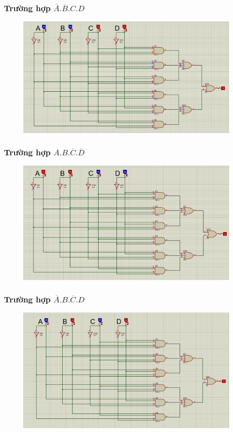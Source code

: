 \subsubsection{Trường hợp $\overline{A}.\overline{B}.C.D$}
\begin{figure}[H]
    \centering
    \includegraphics[width=\textwidth]{pictures/b2.2.png}
\end{figure}
\subsubsection{Trường hợp $A.B.\overline{C}.\overline{D}$}
\begin{figure}[H]
    \centering
    \includegraphics[width=\textwidth]{pictures/b2.1.png}
\end{figure}
\subsubsection{Trường hợp $\overline{A}.B.\overline{C}.D$}
\begin{figure}[H]
    \centering
    \includegraphics[width=\textwidth]{pictures/b2.4.png}
\end{figure}
